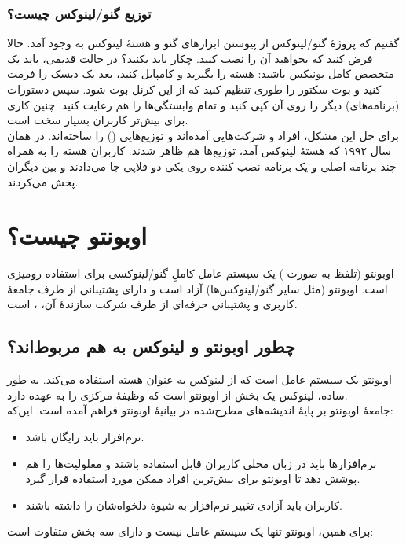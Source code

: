 \subsubsection{توزیع گنو/لینوکس چیست؟}
گفتیم که پروژهٔ گنو/لینوکس از پیوستن ابزارهای گنو و هستهٔ لینوکس به وجود آمد. حالا فرض کنید که بخواهید آن را نصب کنید. چکار باید بکنید؟ در حالت قدیمی، باید یک متخصص کامل یونیکس باشید: هسته را بگیرید و کامپایل کنید، بعد یک دیسک را فرمت کنید و بوت سکتور را طوری تنظیم کنید که از این کرنل بوت شود. سپس دستورات (برنامه‌های) دیگر را روی آن کپی کنید و تمام وابستگی‌ها را هم رعایت کنید. چنین کاری برای بیش‌تر کاربران بسیار سخت است.\\
برای حل این مشکل، افراد و شرکت‌هایی آمده‌اند و توزیع‌هایی () را ساخته‌اند. در همان سال ۱۹۹۲ که هستهٔ لینوکس آمد، توزیع‌ها هم ظاهر شدند. کاربران هسته را به همراه چند برنامه اصلی و یک برنامه نصب کننده روی یکی دو فلاپی جا می‌دادند و بین دیگران پخش می‌کردند.
\section{اوبونتو چیست؟}
اوبونتو (تلفظ به صورت ) یک سیستم عامل کاملِ گنو/لینوکسی برای استفاده رومیزی است. اوبونتو (مثل سایر گنو/لینوکس‌ها) آزاد است و دارای پشتیبانی از طرف جامعهٔ کاربری و پشتیبانی حرفه‌ای از طرف شرکت سازندهٔ آن، ، است.\\
\subsection{چطور اوبونتو  و لینوکس به هم مربوط‌اند؟}
اوبونتو یک سیستم عامل است که از لینوکس به عنوان هسته استفاده می‌کند. به طور ساده، لینوکس یک بخش از اوبونتو  است که وظیفهٔ مرکزی را به عهده دارد.\\

جامعهٔ اوبونتو بر پایهٔ اندیشه‌های مطرح‌شده در بیانیهٔ اوبونتو فراهم آمده است. این‌که:

\begin{itemize}
\item نرم‌افزار باید رایگان باشد.
\item نرم‌افزارها باید در زبان محلی کاربران قابل استفاده باشند و معلولیت‌ها را هم پوشش دهد تا اوبونتو برای بیش‌ترین افراد ممکن مورد استفاده قرار گیرد.
\item کاربران باید آزادی تغییر نرم‌افزار به شیوهٔ دلخواه‌شان را داشته باشند.\\
\end{itemize}

برای همین، اوبونتو تنها یک سیستم عامل نیست و دارای سه بخش متفاوت است:

